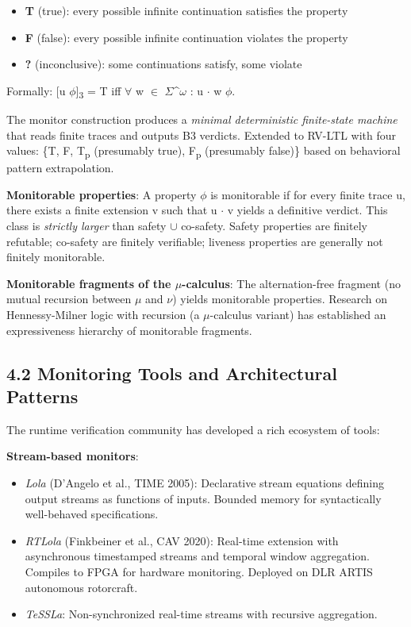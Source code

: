 \documentclass[11pt]{article}
\begin{document}
\begin{itemize}
\item \textbf{T} (true): every possible infinite continuation satisfies the property
\item \textbf{F} (false): every possible infinite continuation violates the property
\item \textbf{?} (inconclusive): some continuations satisfy, some violate
\end{itemize}

Formally: [u \models \(\phi\)]\textsubscript{3} = T iff \(\forall\) w \(\in\) \(\Sigma\)\^{}\(\omega\) : u \(\cdot\) w \models \(\phi\).

The monitor construction produces a \emph{minimal deterministic finite-state machine}
that reads finite traces and outputs B3 verdicts. Extended to RV-LTL with four
values: \{T, F, T\textsubscript{p} (presumably true), F\textsubscript{p} (presumably false)\} based on
behavioral pattern extrapolation.

\textbf{Monitorable properties}: A property \(\phi\) is monitorable if for every finite
trace u, there exists a finite extension v such that u \(\cdot\) v yields a
definitive verdict. This class is \emph{strictly larger} than safety \(\cup\) co-safety.
Safety properties are finitely refutable; co-safety are finitely verifiable;
liveness properties are generally not finitely monitorable.

\textbf{Monitorable fragments of the \(\mu\)-calculus}: The alternation-free fragment (no
mutual recursion between \(\mu\) and \(\nu\)) yields monitorable properties. Research
on Hennessy-Milner logic with recursion (a \(\mu\)-calculus variant) has
established an expressiveness hierarchy of monitorable fragments.
\subsection{4.2 Monitoring Tools and Architectural Patterns}
\label{sec:orgcc07987}

The runtime verification community has developed a rich ecosystem of tools:

\textbf{Stream-based monitors}:
\begin{itemize}
\item \emph{Lola} (D'Angelo et al., TIME 2005): Declarative stream equations defining
output streams as functions of inputs. Bounded memory for syntactically
well-behaved specifications.
\item \emph{RTLola} (Finkbeiner et al., CAV 2020): Real-time extension with
asynchronous timestamped streams and temporal window aggregation. Compiles to
FPGA for hardware monitoring. Deployed on DLR ARTIS autonomous rotorcraft.
\item \emph{TeSSLa}: Non-synchronized real-time streams with recursive aggregation.
\end{itemize}
\end{document}

